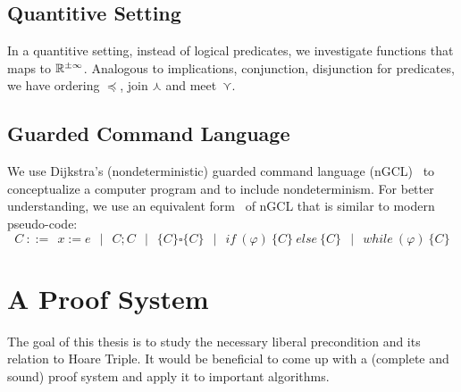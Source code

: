 \documentclass[adraft,hidelinks]{eptcs}
\begin{document}
\subsection{Quantitive Setting}
In a quantitive setting, instead of logical predicates, we investigate functions that maps to $\mathbb{R}^{\pm\infty}$. 
Analogous to implications, conjunction, disjunction for predicates, we have ordering $\preceq$, join $\curlywedge$ and meet~$\curlyvee$. 

\subsection{Guarded Command Language}
We use Dijkstra's (nondeterministic) guarded command language (nGCL)~\cite{Dijkstra1975} to conceptualize a computer program and to include nondeterminism. 
For better understanding, we use an equivalent form~\cite{Zhang2022} of nGCL that is similar to modern pseudo-code: 
$$C\ ::=\ \  x:= e \ \ \mid\ \  C;C \ \ \mid\ \  \{C\} \square \{C\} \ \ \mid\ \  
if\ (\varphi)\ \{C\}\ else\ \{C\} \ \ \mid\ \  while\ (\varphi)\ \{C\}$$

\section{A Proof System}
The goal of this thesis is to study the necessary liberal precondition and its relation to Hoare Triple. 
It would be beneficial to come up with a (complete and sound) proof system and apply it to important algorithms. 








\end{document}
